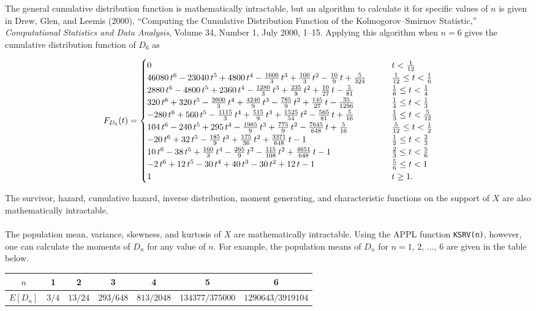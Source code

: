 \documentclass[12pt,fullpage]{article}
\begin{document}
\noindent
The general cumulative distribution function is mathematically intractable, but an algorithm to calculate
it for specific values of $n$ is given in 
Drew, Glen, and Leemis (2000),
``Computing the Cumulative Distribution Function of the Kolmogorov--Smirnov Statistic,''
{\it Computational Statistics and Data Analysis}, Volume 34, Number 1, July 2000, 1--15.
Applying this algorithm when $n = 6$ gives the cumulative distribution function of $D_6$ as
\begin{small}
\[
F_{D_6}(t) =
\begin{cases}
0 & \qquad t <  \frac {1}{12} 
\cr 46080\,{t}^{6} - 23040\,{t}^{5} + 4800\,{t}^{4} -
\frac {1600}{3}\,{t}^{3} +
  \frac {100}{3}\,{t}^{2} - \frac {10}{9}\,{t} + \frac
{5}{324}
  & \qquad  \frac {1}{12} \leq t <  \frac {1}{6} 
\cr   2880\,t^{6} - 4800\,t^{5} + 2360\,t^{4} -  \frac
{1280}{3} \,t^{3}
  + \frac {235}{9} \,t^{2} + \frac {10}{27} \,t -
\frac {5}{81}
  & \qquad \frac {1}{6} \leq t <  \frac {1}{4} 
\cr  320\,t^{6} + 320\,t^{5}   - \frac {2600}{3}
\,t^{4}
  +  \frac {4240}{9} \,t^{3}
  -  \frac {785}{9} \,t^{2} + \frac {145}{27} \,t -
\frac {35}{1296}
  & \qquad \frac {1}{4} \leq t <  \frac {1}{3}
\cr  - 280\,t^{6} + 560\,t^{5} -  \frac {1115}{3}
\,t^{4} +
  \frac {515}{9} \,t^{3}  +  \frac {1525}{54} \,t^{2}
-  \frac {565}{81} \,t +
  \frac {5}{16}
  & \qquad  \frac {1}{3} \leq t < \frac {5}{12} 
\cr  104\,t^{6} - 240\,t^{5} + 295\,t^{4} - \frac
{1985}{9} \,t^{3}
  + \frac {775}{9} \,t^{2} -  \frac {7645}{648} \,t +
\frac {5}{16}
  & \qquad  \frac {5}{12} \leq t < \frac {1}{2} 
\cr   - 20\,t^{6}  + 32\,t^{5}  -  \frac {185}{9}
\,t^{3}
  +  \frac {175}{36} \,t^{2}  +  \frac {3371}{648} \,t
- 1
 & \qquad  \frac {1}{2} \leq t < \frac {2}{3} 
\cr  10\,t^{6} - 38\, t^{5}  +  \frac {160}{3} \,t^{4}
 - \frac {265}{9} \,t^{3} -  \frac {115}{108} \,t^{2}
  +  \frac {4651}{648} \,t - 1
  & \qquad  \frac {2}{3} \leq t <  \frac {5}{6} 
\cr   - 2\,t^{6} + 12\,t^{5}  - 30\,t^{4} + 40\,t^{3}
- 30\,t^{2} + 12\,t - 1
  & \qquad  \frac {5}{6} \leq t < 1
\cr 1
  & \qquad t \geq 1.\cr 
  \end{cases}
\]
\end{small}

\noindent
The survivor, hazard, cumulative hazard, inverse distribution, moment generating, and characteristic functions on the support 
of $X$ are also mathematically intractable.\\
\\
The population mean, variance, skewness, and kurtosis of $X$ are mathematically intractable.
Using the APPL function {\tt KSRV(n)}, however, one can calculate the moments of $D_n$ for
any value of $n$.  For example, the population means of $D_n$ for $n = 1, \, 2, \, \ldots, \, 6$ are given
in the table below.

\begin{center}
\begin{tabular}{c|c|c|c|c|c|c}
$n$ & 1 & 2 & 3 & 4 & 5 & 6 \\ \hline
$E[D_n]$ & $3/4$ & $13/24$ & $293/648$ & $813/2048$ & $134377/375000$ & $1290643/3919104$
\end{tabular}
\end{center}
\end{document}
